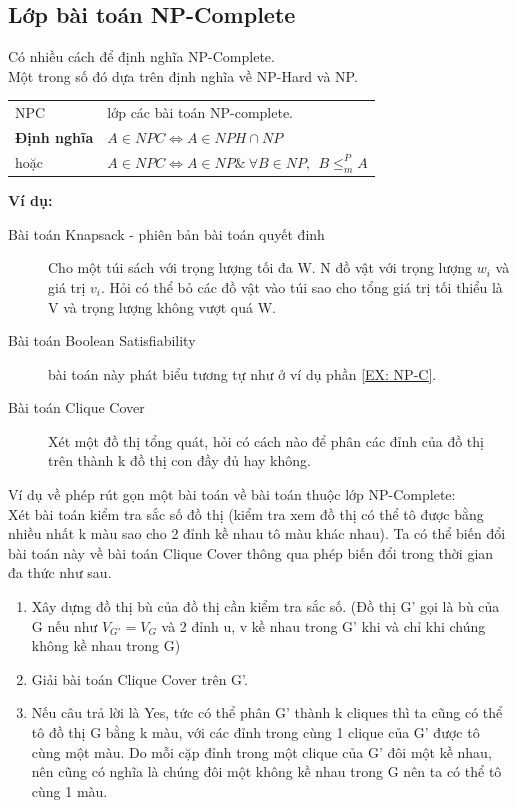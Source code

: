 \documentclass[a4paper 14pt]{article}
\begin{document}
		\subsection{Lớp bài toán NP-Complete}
			Có nhiều cách để định nghĩa NP-Complete.\\
			Một trong số đó dựa trên định nghĩa về NP-Hard và NP.\\
			\begin{addmargin}{0.5in}
				\begin{tabular}{l l}
				NPC & lớp các bài toán NP-complete.\\
				\textbf{Định nghĩa} & $A \in NPC \Leftrightarrow A \in NPH \cap NP$\\
				hoặc & $A \in NPC \Leftrightarrow A \in NP\&~\forall B \in NP,~~B \leq^{P}_{m}A$\\
				\end{tabular}
			\end{addmargin}
			\textbf{Ví dụ:}
			\begin{description}
				\item[Bài toán Knapsack - phiên bản bài toán quyết đinh]  Cho một túi sách với trọng lượng tối đa W. N đồ vật với trọng lượng $w_{i}$ và giá trị $v_{i}$. Hỏi có thể bỏ các đồ vật vào túi sao cho tổng giá trị tối thiểu là V và trọng lượng không vượt quá W.
				\item[Bài toán Boolean Satisfiability] bài toán này phát biểu tương tự như ở ví dụ phần \ref{EX: NP-C}.
				\item[Bài toán Clique Cover] Xét một đồ thị tổng quát, hỏi có cách nào để phân các đỉnh của đồ thị trên thành k đồ thị con đầy đủ hay không.
			\end{description}
			Ví dụ về phép rút gọn một bài toán về bài toán thuộc lớp NP-Complete:\\
			Xét bài toán kiểm tra sắc số đồ thị (kiểm tra xem đồ thị có thể tô được bằng nhiều nhất k màu sao cho 2 đỉnh kề nhau tô màu khác nhau). Ta có thể biến đổi bài toán này về bài toán Clique Cover thông qua phép biến đổi trong thời gian đa thức như sau.\\
			\begin{enumerate}
				\item Xây dựng đồ thị bù của đồ thị cần kiểm tra sắc số. (Đồ thị G' gọi là bù của G nếu như $V_{G'} = V_{G}$ và 2 đỉnh u, v kề nhau trong G' khi và chỉ khi chúng không kề nhau trong G)
				\item Giải bài toán Clique Cover trên G'.
				\item Nếu câu trả lời là Yes, tức có thể phân G' thành k cliques thì ta cũng có thể tô đồ thị G bằng k màu, với các đỉnh trong cùng 1 clique của G' được tô cùng một màu. Do mỗi cặp đỉnh trong một clique của G' đôi một kề nhau, nên cũng có nghĩa là chúng đôi một không kề nhau trong G nên ta có thể tô cùng 1 màu.
			\end{enumerate}
\end{document}
